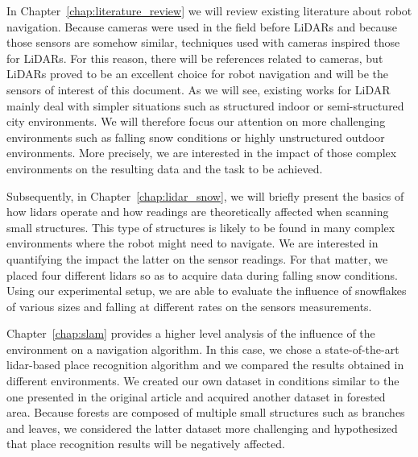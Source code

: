 In Chapter~\ref{chap:literature_review} we will review existing literature about robot navigation. Because cameras were used in the field before LiDARs and because those sensors are somehow similar, techniques used with cameras inspired those for LiDARs. For this reason, there will be references related to cameras, but LiDARs proved to be an excellent choice for robot navigation and will be the sensors of interest of this document. As we will see, existing works for LiDAR mainly deal with simpler situations such as structured indoor or semi-structured city environments. We will therefore focus our attention on more challenging environments such as falling snow conditions or highly unstructured outdoor environments. More precisely, we are interested in the impact of those complex environments on the resulting data and the task to be achieved.

Subsequently, in Chapter~\ref{chap:lidar_snow}, we will briefly present the basics of how \gls*{lidar}s operate and how readings are theoretically affected when scanning small structures. This type of structures is likely to be found in many complex environments where the robot might need to navigate. We are interested in quantifying the impact the latter on the sensor readings. For that matter, we placed four different \gls*{lidar}s so as to acquire data during falling snow conditions. Using our experimental setup, we are able to evaluate the influence of snowflakes of various sizes and falling at different rates on the sensors measurements. 

Chapter~\ref{chap:slam} provides a higher level analysis of the influence of the environment on a navigation algorithm. In this case, we chose a state-of-the-art \gls*{lidar}-based place recognition algorithm and we compared the results obtained in different environments. We created our own dataset in conditions similar to the one presented in the original article and acquired another dataset in forested area. Because forests are composed of multiple small structures such as branches and leaves, we considered the latter dataset more challenging and hypothesized that place recognition results will be negatively affected.
